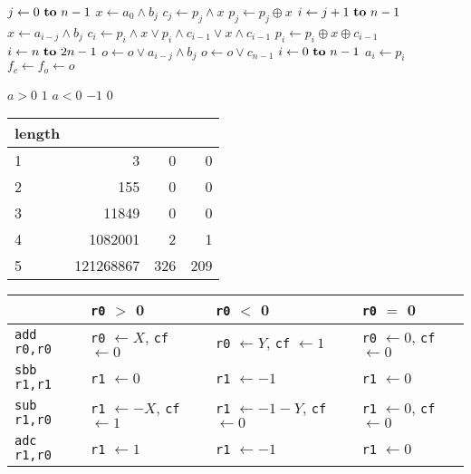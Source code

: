 \documentclass{beamer}
\renewcommand{\gets}{\leftarrow}
\newcommand{\AND}{\land}
\newcommand{\IOR}{\lor}
\newcommand{\XOR}{\oplus}
\begin{document}
\begin{frame}
\begin{codebox}
\zi \For $j \gets 0 \To n-1$ \Do
\zi   $x \gets a_{0} \AND b_{j}$
\zi   $c_{j} \gets p_{j} \AND x$
\zi   $p_{j} \gets p_{j} \XOR x$
\zi   \For $i \gets j+1 \To n-1$ \Do
\zi     $x \gets a_{i-j} \AND b_{j}$
\zi     $c_{i} \gets p_{i} \AND x \IOR p_{i} \AND c_{i-1} \IOR x \AND c_{i-1}$
\zi     $p_{i} \gets p_{i} \XOR x \XOR c_{i-1}$ \End
\zi   \For $i \gets n \To 2n-1$ \Do
\zi     $o \gets o \IOR a_{i-j} \AND b_{j}$ \End
\zi   $o \gets o \IOR c_{n-1}$ \End
\zi \For $i \gets 0 \To n-1$ \Do
\zi   $a_{i} \gets p_{i}$ \End
\zi $f_c \gets f_o \gets o$
\end{codebox}
\end{frame}

\begin{frame}
\begin{codebox}
\zi \If $a > 0$ \Do
\zi   \Return $1$ \End
\zi \If $a < 0$ \Do
\zi   \Return $-1$ \End
\zi \Return $0$
\end{codebox}
\end{frame}

\begin{frame}
\begin{table}
\tiny
\begin{tabular}{l|rrr}
length & & & \\
\hline
1 &         3 &   0 &   0 \\
2 &       155 &   0 &   0 \\
3 &     11849 &   0 &   0 \\
4 &   1082001 &   2 &   1 \\
5 & 121268867 & 326 & 209 \\
\end{tabular}
\end{table}
\end{frame}

\begin{frame}[containsverbatim]
\begin{table}
\tiny
\begin{tabular}{l|lll}
& \verb|r0| $>$ 0
& \verb|r0| $<$ 0
& \verb|r0| $=$ 0 \\
\hline
\verb|add r0,r0|
& \verb|r0| $\gets X$, \verb|cf| $\gets 0$
& \verb|r0| $\gets Y$, \verb|cf| $\gets 1$
& \verb|r0| $\gets 0$, \verb|cf| $\gets 0$ \\
\verb|sbb r1,r1|
& \verb|r1| $\gets 0$
& \verb|r1| $\gets -1$
& \verb|r1| $\gets 0$ \\
\verb|sub r1,r0|
& \verb|r1| $\gets -X$, \verb|cf| $\gets 1$
& \verb|r1| $\gets -1-Y$, \verb|cf| $\gets 0$
& \verb|r1| $\gets 0$, \verb|cf| $\gets 0$ \\
\verb|adc r1,r0|
& \verb|r1| $\gets 1$
& \verb|r1| $\gets -1$
& \verb|r1| $\gets 0$ \\
\end{tabular}
\end{table}
\end{frame}
\end{document}
